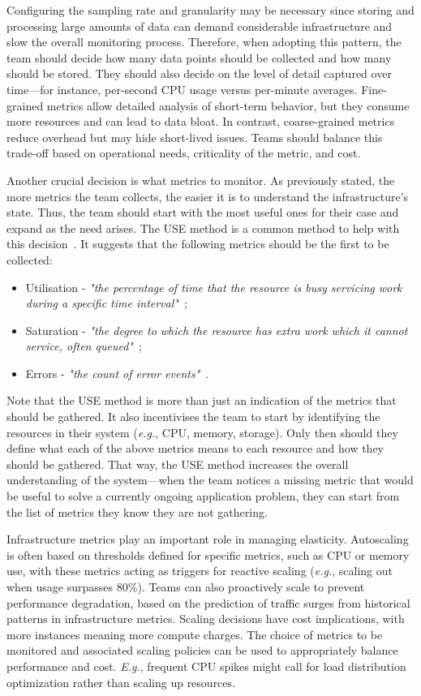 \documentclass[runningheads]{llncs}
\begin{document}
Configuring the sampling rate and granularity may be necessary since storing and processing large amounts of data can demand considerable infrastructure and slow the overall monitoring process. Therefore, when adopting this pattern, the team should decide how many data points should be collected and how many should be stored. They should also decide on the level of detail captured over time---for instance, per-second CPU usage versus per-minute averages. Fine-grained metrics allow detailed analysis of short-term behavior, but they consume more resources and can lead to data bloat. In contrast, coarse-grained metrics reduce overhead but may hide short-lived issues. Teams should balance this trade-off based on operational needs, criticality of the metric, and cost.

Another crucial decision is what metrics to monitor. As previously stated, the more metrics the team collects, the easier it is to understand the infrastructure's state. Thus, the team should start with the most useful ones for their case and expand as the need arises. The USE method is a common method to help with this decision~\cite{Gregg-2013}. It suggests that the following metrics should be the first to be collected:

\begin{itemize}
    \item Utilisation - \textit{"the percentage of time that the resource is busy servicing work during a specific time interval"}~\cite{Gregg-2013};
    \item Saturation - \textit{"the degree to which the resource has extra work which it cannot service, often queued"}~\cite{Gregg-site-2017};
    \item Errors - \textit{"the count of error events"}~\cite{Gregg-2013}.
\end{itemize}

Note that the USE method is more than just an indication of the metrics that should be gathered. It also incentivises the team to start by identifying the resources in their system (\textit{e.g.}, CPU, memory, storage). Only then should they define what each of the above metrics means to each resource and how they should be gathered. That way, the USE method increases the overall understanding of the system---when the team notices a missing metric that would be useful to solve a currently ongoing application problem, they can start from the list of metrics they know they are not gathering.

Infrastructure metrics play an important role in managing elasticity. Autoscaling is often based on thresholds defined for specific metrics, such as CPU or memory use, with these metrics acting as triggers for reactive scaling (\textit{e.g.}, scaling out when usage surpasses 80\%). Teams can also proactively scale to prevent performance degradation, based on the prediction of traffic surges from historical patterns in infrastructure metrics. Scaling decisions have cost implications, with more instances meaning more compute charges. The choice of metrics to be monitored and associated scaling policies can be used to appropriately balance performance and cost. \textit{E.g.}, frequent CPU spikes might call for load distribution optimization rather than scaling up resources.
\end{document}
